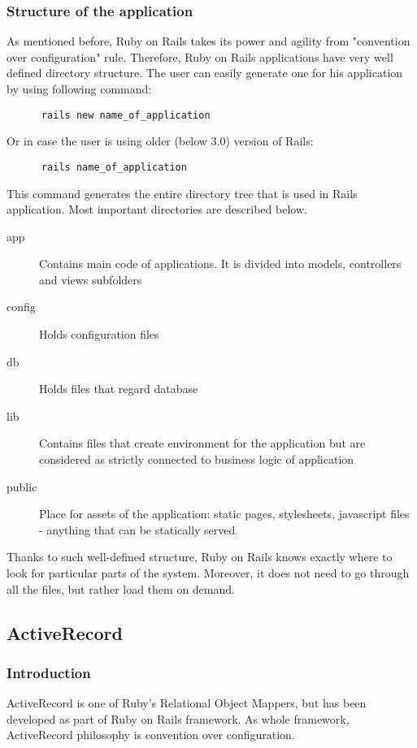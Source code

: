     \subsubsection{Structure of the application}
    As mentioned before, Ruby on Rails takes its power and agility from "convention over configuration" rule. Therefore, Ruby on Rails applications have very well defined directory structure. The user can easily generate one for his application by using following command:
    \begin{lstlisting}
      rails new name_of_application
    \end{lstlisting}
    
    Or in case the user is using older (below 3.0) version of Rails:
    
    \begin{lstlisting}
      rails name_of_application
    \end{lstlisting}
    
    This command generates the entire directory tree that is used in Rails application. Most important directories are described below.

    \begin{description}
      \item[app] Contains main code of applications. It is divided into models, controllers and views subfolders
      \item[config] Holds configuration files
      \item[db] Holds files that regard database
      \item[lib] Contains files that create environment for the application but are considered as strictly connected to business logic of application
      \item[public] Place for assets of the application: static pages, stylesheets, javascript files - anything that can be statically served.
    \end{description}

    Thanks to such well-defined structure, Ruby on Rails knows exactly where to look for particular parts of the system. Moreover, it does not need to go through all the files, but rather load them on demand.

    \subsection{ActiveRecord}
      \subsubsection{Introduction}
      ActiveRecord is one of Ruby's Relational Object Mappers, but has been developed as
      part of Ruby on Rails framework. As whole framework, ActiveRecord philosophy is convention
      over configuration.

